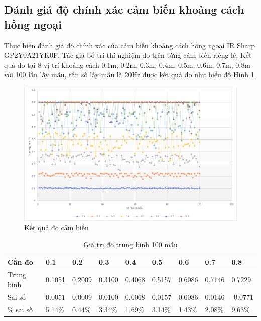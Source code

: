 {\subsection{Đánh giá độ chính xác cảm biến khoảng cách hồng ngoại}
\label{sub:DanhgiaCBIR}

Thực hiện đánh giá độ chính xác của cảm biến khoảng cách hồng ngoại IR Sharp GP2Y0A21YK0F. Tác giả bố trí thí nghiệm đo trên từng cảm biến riêng lẻ. Kết quả đo tại 8 vị trí khoảng cách 0.1m, 0.2m, 0.3m, 0.4m, 0.5m, 0.6m, 0.7m, 0.8m với 100 lần lấy mẫu, tần số lấy mẫu là 20Hz được kết quả đo như biểu đồ Hình \ref{fig:Ir-eval-100}.

\begin{figure}[htbp]
    \centering
    \includegraphics[width=\linewidth]{figures/IR-eval-chart.png}
    \caption{Kết quả đo cảm biến}
    \label{fig:Ir-eval-100}
\end{figure}

\begin{table}[htbp]
    \begin{tabular}{|m{1.5cm}|m{1.2cm}|m{1.2cm}|m{1.2cm}|m{1.2cm}|m{1.2cm}|m{1.2cm}|m{1.2cm}|m{1.4cm}|}
        \hline
        Cần đo     & 0.1      & 0.2      & 0.3      & 0.4      & 0.5      & 0.6      & 0.7      & 0.8      \\ \hline
        Trung bình & 0.1051   & 0.2009   & 0.3100   & 0.4068   & 0.5157   & 0.6086   & 0.7146       & 0.7229 \\ \hline
        Sai số & 0.0051 & 0.0009 &   0.0100 & 0.0068 &   0.0157 & 0.0086 &   0.0146 & -0.0771 \\ \hline
        \% sai số  & 5.14\% & 	0.44\% &	3.34\% &	1.69\% &	3.14\% &	1.43\% &	2.08\% &	9.63\% \\
        \hline
    \end{tabular}
    \caption{Giá trị đo trung bình 100 mẫu}
    \label{table:ir-evarage}
\end{table}


}
